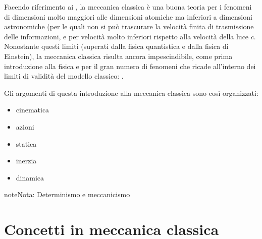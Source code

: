 \documentclass[letterpaper,10pt,italian]{jupyterBook}
\begin{document}
\sphinxAtStartPar
Facendo riferimento ai {\hyperref[\detokenize{ch/intro/current-status:physics-hs-intro-current-status-regimes}]{}}, la meccanica classica è una buona teoria per i fenomeni di dimensioni molto maggiori alle dimensioni atomiche ma inferiori a dimensioni astronomiche (per le quali non si può trascurare la velocità finita di trasmissione delle informazioni, e per velocità molto inferiori rispetto alla velocità della luce \(c\). Nonostante questi limiti (superati dalla fisica quantistica e dalla fisica di Einstein), la meccanica classica risulta ancora impescindibile, come prima introduzione alla fisica e per il gran numero di fenomeni che ricade all’interno dei limiti di validità del modello classico: .

\sphinxAtStartPar
Gli argomenti di questa introduzione alla meccanica classica sono così organizzati:
\begin{itemize}
\item {} 
\sphinxAtStartPar
cinematica

\item {} 
\sphinxAtStartPar
azioni

\item {} 
\sphinxAtStartPar
statica

\item {} 
\sphinxAtStartPar
inerzia

\item {} 
\sphinxAtStartPar
dinamica

\end{itemize}

\begin{sphinxadmonition}{note}{Nota:}
\sphinxAtStartPar
Determinismo e meccanicismo
 
\end{sphinxadmonition}

\sphinxstepscope


\section{Concetti in meccanica classica}
\label{\detokenize{ch/mechanics/intro-vocabulary:concetti-in-meccanica-classica}}\label{\detokenize{ch/mechanics/intro-vocabulary:physics-hs-mechanics-intro-vocabulary}}\label{\detokenize{ch/mechanics/intro-vocabulary::doc}}
\end{document}
